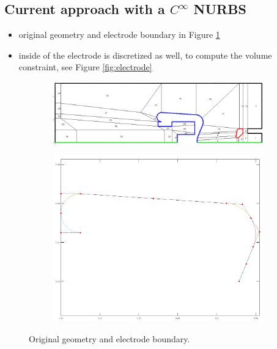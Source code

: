 \subsection{Current approach with a $C^{\infty}$ NURBS}
\begin{itemize}
    \item original geometry and electrode boundary in Figure \ref{fig:original}
    \item inside of the electrode is discretized as well, to compute the volume constraint, see Figure \ref{fig:electrode}
\end{itemize}

\begin{center}
\begin{figure}[H]
    \begin{subfigure}{0.45\textwidth}
        \includegraphics[width=\textwidth]{fig/png/geometry_v6}
    \end{subfigure}
    \begin{subfigure}{0.45\textwidth}
        \includegraphics[width=\textwidth]{fig/png/original}
    \end{subfigure}
    \caption{Original geometry and electrode boundary.}
    \label{fig:original}
\end{figure}
\end{center}

